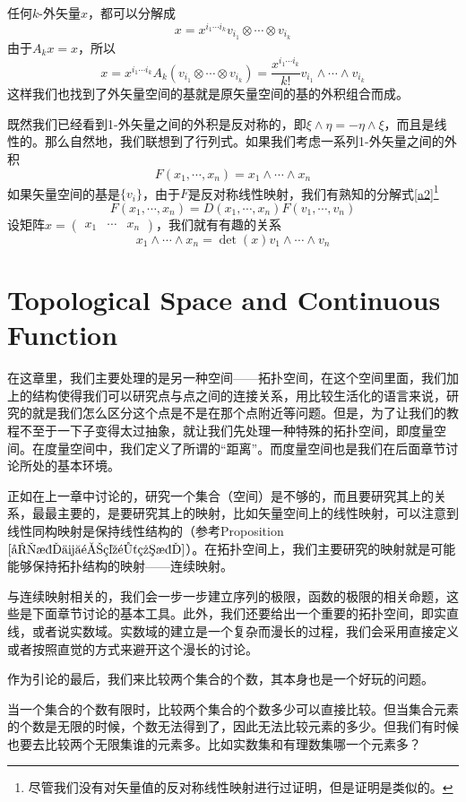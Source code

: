 \documentclass[11pt,a4paper,openany]{book}%
\theoremstyle{plain}%
\newcommand{\pref}[1]{{\rm Proposition} $\ref{#1}$}
\begin{document}
任何$k$-外矢量$x$，都可以分解成
\[
x=x^{i_1\cdots i_k}v_{i_1} \otimes \cdots \otimes v_{i_k}
\]
由于$A_kx=x$，所以
\[
x=x^{i_1\cdots i_k}A_k(v_{i_1} \otimes \cdots \otimes v_{i_k})=\frac{x^{i_1\cdots i_k}}{k!}v_{i_1} \wedge \cdots \wedge v_{i_k}
\]
这样我们也找到了外矢量空间的基就是原矢量空间的基的外积组合而成。

既然我们已经看到1-外矢量之间的外积是反对称的，即$\xi \wedge \eta=-\eta \wedge \xi$，而且是线性的。那么自然地，我们联想到了行列式。如果我们考虑一系列1-外矢量之间的外积
\[
F(x_1, \cdots,x_n)=x_1\wedge \cdots \wedge x_n
\]
如果矢量空间的基是$\{v_i\}$，由于$F$是反对称线性映射，我们有熟知的分解式\eqref{a2}\footnote{尽管我们没有对矢量值的反对称线性映射进行过证明，但是证明是类似的。}
\[
F(x_1, \cdots,x_n)=D(x_1, \cdots,x_n)F(v_1, \cdots,v_n)
\]
设矩阵$x=\begin{pmatrix}x_1 &\cdots& x_n\end{pmatrix}$，我们就有有趣的关系
\[
x_1\wedge \cdots \wedge x_n=\det(x)v_1\wedge \cdots \wedge v_n
\]
\chapter{Topological Space and Continuous Function}
在这章里，我们主要处理的是另一种空间——拓扑空间，在这个空间里面，我们加上的结构使得我们可以研究点与点之间的连接关系，用比较生活化的语言来说，研究的就是我们怎么区分这个点是不是在那个点附近等问题。但是，为了让我们的教程不至于一下子变得太过抽象，就让我们先处理一种特殊的拓扑空间，即度量空间。在度量空间中，我们定义了所谓的“距离”。而度量空间也是我们在后面章节讨论所处的基本环境。

正如在上一章中讨论的，研究一个集合（空间）是不够的，而且要研究其上的关系，最最主要的，是要研究其上的映射，比如矢量空间上的线性映射，可以注意到线性同构映射是保持线性结构的（参考\pref{同构传递空间结构}）。在拓扑空间上，我们主要研究的映射就是可能能够保持拓扑结构的映射——连续映射。

与连续映射相关的，我们会一步一步建立序列的极限，函数的极限的相关命题，这些是下面章节讨论的基本工具。此外，我们还要给出一个重要的拓扑空间，即实直线，或者说实数域。实数域的建立是一个复杂而漫长的过程，我们会采用直接定义或者按照直觉的方式来避开这个漫长的讨论。

作为引论的最后，我们来比较两个集合的个数，其本身也是一个好玩的问题。

当一个集合的个数有限时，比较两个集合的个数多少可以直接比较。但当集合元素的个数是无限的时候，个数无法得到了，因此无法比较元素的多少。但我们有时候也要去比较两个无限集谁的元素多。比如实数集和有理数集哪一个元素多？
\end{document}
